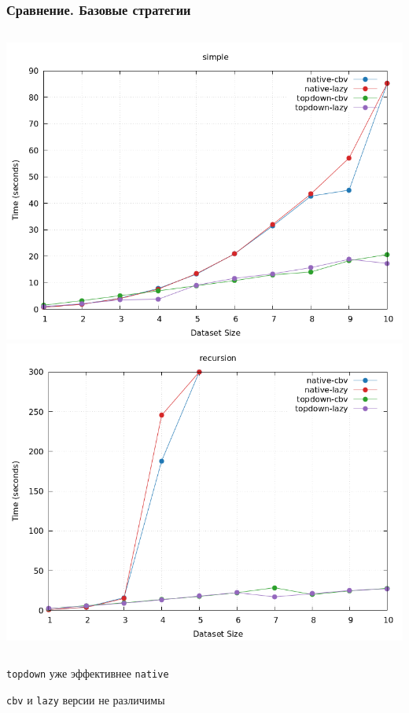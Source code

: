 \documentclass{beamer}
\begin{document}
\begin{frame}\frametitle{Сравнение. Базовые стратегии}
  \begin{columns}
    \includegraphics[width=\textwidth]{basic_simple.png}
    \includegraphics[width=\textwidth]{basic_recursion.png}
  \end{columns}

  \bigskip
  \centering \texttt{topdown} уже эффективнее \texttt{native}
  \bigskip

  \texttt{cbv} и \texttt{lazy} версии не различимы
  \end{frame}
\end{document}
